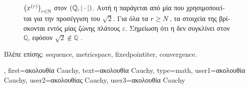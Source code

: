 {{\begin{figure}[H]
		{
		\caption{  $\big(x^{(r)}\big)_{r\in\mathbb{N}}$ 
			\foreignlanguage{greek}{στον}  $\left( \mathbb{Q},|\cdot| \right)$. 
			\foreignlanguage{greek}{Αυτή η}  \foreignlanguage{greek}{παράγεται από μία} 
			 \foreignlanguage{greek}{που χρησιμοποιείται για την προσέγγιση του} 
			$\sqrt{2}$. \foreignlanguage{greek}{Για όλα τα $r \ge N$, τα στοιχεία της}  
			\foreignlanguage{greek}{βρίσκονται εντός μίας ζώνης πλάτους $\varepsilon$. 
			Σημείωση ότι η}  \foreignlanguage{greek}{δεν συγκλίνει στον $\mathbb{Q}$, 
			εφόσον} $\sqrt{2} \notin \mathbb{Q}$ \cite[\foreignlanguage{greek}{Παράδειγμα} 1.1]{RudinBookPrinciplesMatheAnalysis}.\label{fig:fpit_cauchy_sqrt2_dict}} }
		\end{figure}
		\foreignlanguage{greek}{Βλέπε επίσης:} \gls{sequence}, \gls{metricspace}, \gls{fixedpointiter}, \gls{convergence}. }, 
	first={\foreignlanguage{greek}{ακολουθία} Cauchy},
	text={\foreignlanguage{greek}{ακολουθία} Cauchy},
	type=math,
	user1={\foreignlanguage{greek}{ακολουθία} Cauchy}, %
  	user2={\foreignlanguage{greek}{ακολουθίας} Cauchy}, %
	user3={\foreignlanguage{greek}{ακολουθία} Cauchy} %
}


